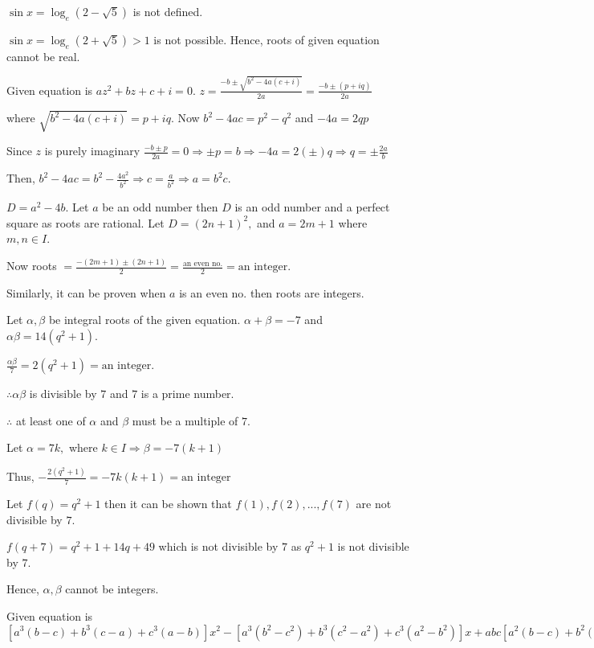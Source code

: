   $\sin x = \log_e (2 - \sqrt{5})$ is not defined.

  $\sin x = \log_e (2 + \sqrt{5}) > 1$ is not possible. Hence, roots of given equation cannot be real.
\item Given equation is $az^2 + bz + c + i = 0$. $z = \frac{-b \pm \sqrt{b^2 - 4a(c + i)}}{2a} = \frac{-b
  \pm(p + iq)}{2a}$

  where $\sqrt{b^2 - 4a(c + i)} = p + iq$. Now $b^2 - 4ac = p^2 - q^2$ and $-4a = 2qp$

  Since $z$ is purely imaginary $\frac{-b \pm p}{2a} = 0 \Rightarrow \pm p = b\Rightarrow -4a = 2(\pm)q
  \Rightarrow q = \pm \frac{2a}{b}$

  Then, $b^2 - 4ac = b^2 - \frac{4a^2}{b^2}\Rightarrow c = \frac{a}{b^2} \Rightarrow a = b^2c$.
\item $D = a^2 - 4b$. Let $a$ be an odd number then $D$ is an odd number and a perfect square as roots
  are rational. Let $D = (2n + 1)^2,$ and $a = 2m + 1$ where $m, n \in I$.

  Now roots $= \frac{-(2m + 1)\pm (2n + 1)}{2} = \frac{\text{an even no.}}{2} = \text{an integer}$.

  Similarly, it can be proven when $a$ is an even no. then roots are integers.
\item Let $\alpha, \beta$ be integral roots of the given equation. $\alpha + \beta = -7$ and $\alpha\beta =
  14(q^2 + 1)$.

  $\frac{\alpha\beta}{7} = 2(q^2 + 1) = \text{an integer}$.

  $\therefore \alpha\beta$ is divisible by $7$ and $7$ is a prime number.

  $\therefore$ at least one of $\alpha$ and $\beta$ must be a multiple of $7$.

  Let $\alpha = 7k,$ where $k \in I\Rightarrow \beta = -7(k + 1)$

  Thus, $-\frac{2(q^2 + 1)}{7} = -7k(k + 1) = \text{an integer}$

  Let $f(q) = q^2 + 1$ then it can be shown that $f(1), f(2), ..., f(7)$ are not divisible by $7$.

  $f(q + 7) = q^2 + 1 + 14q + 49$ which is not divisible by $7$ as $q^2 + 1$ is not divisible by $7$.

  Hence, $\alpha, \beta$ cannot be integers.
\item Given equation is $[a^3(b - c) + b^3(c - a) + c^3(a - b)]x^2 - [a^3(b^2 - c^2) + b^3(c^2 - a^2) +
  c^3(a^2 - b^2)]x + abc[a^2(b - c) + b^2(c - a) + c^2(a - b)] = 0$

